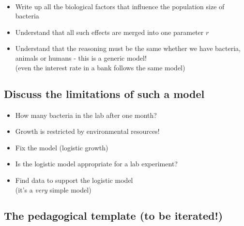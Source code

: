 \documentclass[%
twoside,                 %
final,                   %
10pt]{article}
\begin{document}
\paragraph{}
\begin{itemize}
 \item Write up all the biological factors that influence the
   population size of bacteria

 \item Understand that all such effects are merged into one parameter $r$

 \item Understand that the reasoning must be the same whether we
   have bacteria, animals or humans - this is a generic model!\\
   (even the interest rate in a bank follows the same model)
\end{itemize}

\noindent



\subsection{Discuss the limitations of such a model}


\paragraph{}
\begin{itemize}
 \item How many bacteria in the lab after one month?

 \item Growth is restricted by environmental resources!

 \item Fix the model (logistic growth)

 \item Is the logistic model appropriate for a lab experiment?

 \item Find data to support the logistic model \\
   (it's a \emph{very} simple model)
\end{itemize}

\noindent




\subsection{The pedagogical template (to be iterated!)}
\end{document}
